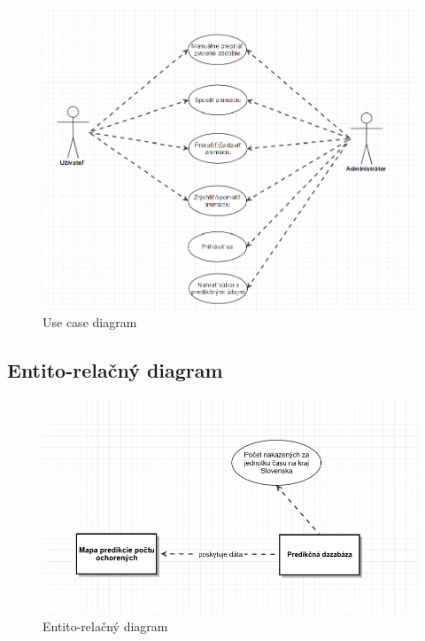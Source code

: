 \documentclass[12pt,a4paper]{report}
\begin{document}
\begin{figure}[htb]
	\centering
	\includegraphics[scale=0.6]{use_case_diagram}
	\caption{Use case diagram}
	\label{fig:Use case diagram}
\end{figure}


\FloatBarrier
\clearpage
\subsection[Entito-relačný diagram]{\rmfamily\bfseries
	Entito-relačný diagram}

\begin{figure}[htb]
	\centering
	\includegraphics[scale=0.7]{E-R_diagram}
	\caption{Entito-relačný diagram}
	\label{fig:Entito-relačný diagram}
\end{figure}

\FloatBarrier
\end{document}
